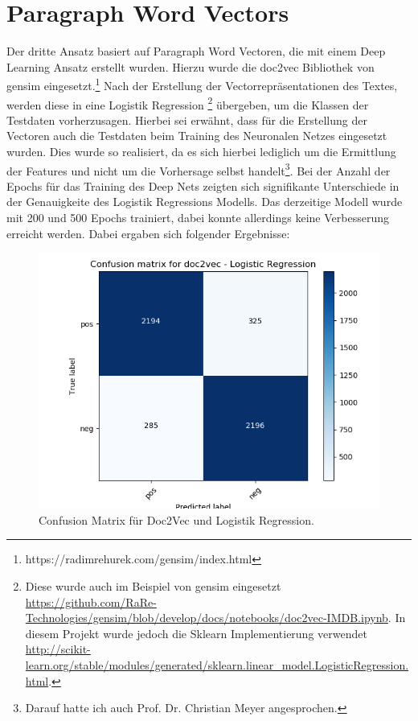 \documentclass[12pt]{scrartcl}
\begin{document}
    \section{Paragraph Word Vectors}\label{sec:paragraphWordVectors}
    Der dritte Ansatz basiert auf Paragraph Word Vectoren, die mit einem Deep Learning Ansatz erstellt wurden.
    Hierzu wurde die \glqq{}doc2vec\grqq{} Bibliothek von gensim eingesetzt.\footnote{https://radimrehurek.com/gensim/index.html}
    Nach der Erstellung der Vectorrepräsentationen des Textes, werden diese in eine Logistik Regression
    \footnote{Diese wurde auch im Beispiel von gensim eingesetzt \url{https://github.com/RaRe-Technologies/gensim/blob/develop/docs/notebooks/doc2vec-IMDB.ipynb}.
    In diesem Projekt wurde jedoch die Sklearn Implementierung verwendet \url{http://scikit-learn.org/stable/modules/generated/sklearn.linear_model.LogisticRegression.html}.}
    übergeben, um die Klassen der Testdaten vorherzusagen.
    Hierbei sei erwähnt, dass für die Erstellung der Vectoren auch die Testdaten beim Training des Neuronalen Netzes eingesetzt wurden.
    Dies wurde so realisiert, da es sich hierbei lediglich um die Ermittlung der Features und nicht um die Vorhersage selbst handelt\footnote{Darauf hatte ich auch Prof. Dr. Christian Meyer angesprochen.}.
    Bei der Anzahl der Epochs für das Training des Deep Nets zeigten sich signifikante Unterschiede in der Genauigkeite des Logistik Regressions Modells.
    Das derzeitige Modell wurde mit 200 und 500 Epochs trainiert, dabei konnte allerdings keine Verbesserung erreicht werden.
    \newpage
    Dabei ergaben sich folgender Ergebnisse:

    \begin{figure}[htbp]
        \centering
        \includegraphics[scale=.35]{pictures/doc2vec.png}
        \caption{Confusion Matrix für Doc2Vec und Logistik Regression.}
    \end{figure}
\end{document}
